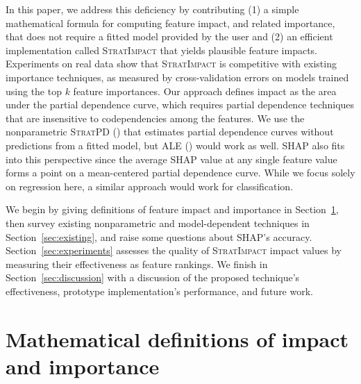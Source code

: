 \documentclass[11pt]{article}
\newcommand{\secref}[1]{Section~\ref{#1}}
\newcommand{\cut}[1]{}
\newcommand{\simp}{\fontfamily{cmr}\textsc{\small StratImpact}}
\newcommand{\spd}{\fontfamily{cmr}\textsc{\small StratPD}}
\begin{document}
In this paper, we address this deficiency by contributing (1) a simple mathematical formula for computing feature impact, and related importance, that does not require a fitted model provided by the user and (2) an efficient implementation called \simp{} that yields plausible feature impacts. Experiments on real data show that \simp{} is competitive with existing importance techniques, as measured by cross-validation errors on models trained using the top $k$ feature importances.  Our approach defines impact as the area under the partial dependence curve, which requires partial dependence techniques that are insensitive to codependencies among the features. We use the nonparametric \spd{} (\citealt{stratpd}) that estimates partial dependence curves without predictions from a fitted model, but ALE (\citealt{apley2016visualizing}) would work as well. SHAP also fits into this perspective since the average SHAP value at any single feature value forms a point on a mean-centered partial dependence curve.  While we focus solely on regression here, a similar approach would work for classification.

We begin by giving definitions of feature impact and importance in \secref{sec:def}, then survey existing nonparametric and model-dependent techniques in \secref{sec:existing}, and raise some questions about SHAP's accuracy. \secref{sec:experiments} assesses the quality of \simp{} impact values by measuring their effectiveness as feature rankings. We finish in \secref{sec:discussion} with a discussion of the proposed technique's effectiveness, prototype implementation's performance, and future work.

\section{Mathematical definitions of impact and importance}\label{sec:def}

\cut{Practitioners loosely define feature importance as feature predictiveness, which presupposes a fitted predictive model, probably because importances are so often used for feature selection during model development.  Research  focuses on more accurately identifying the impact of features upon model predictions.  But, relying on a fitted model makes it difficult to tease apart the true feature importance from the ability of the model to exploit that feature for prediction purposes. Rather than measuring feature impact on {\em model predictions}, we propose avoiding the model completely to define feature importance as the average impact of a feature on the {\em data set response values}.}
\end{document}
